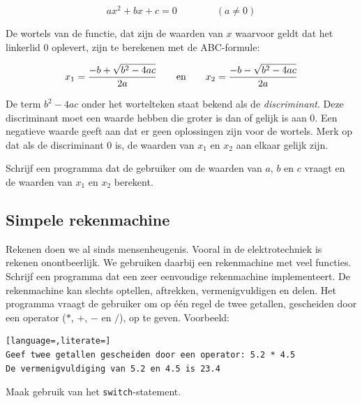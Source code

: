 \documentclass[a4paper,10pt,fleqn,twoside]{article}
\newcommand\strutrule{\rule{0mm}{1.9ex}} %
\begin{document}
\begin{equation*}
ax^2 + bx +c = 0 \qquad\qquad (a \neq 0)
\end{equation*}

De wortels van de functie, dat zijn de waarden van $x$ waarvoor geldt dat het linkerlid 0 oplevert, zijn te berekenen met de ABC-formule:

\begin{equation*}
x_1 = \dfrac{-b+\sqrt{\strutrule b^2-4ac}}{2a} \qquad \text{en} \qquad x_2 = \dfrac{-b-\sqrt{\strutrule b^2-4ac}}{2a}
\end{equation*}

De term $b^2-4ac$ onder het wortelteken staat bekend als de \textsl{discriminant}. Deze discriminant moet een waarde hebben die groter is dan of gelijk is aan 0. Een negatieve waarde geeft aan dat er geen oplossingen zijn voor de wortels. Merk op dat als de discriminant 0 is, de waarden van $x_1$ en $x_2$ aan elkaar gelijk zijn.

Schrijf een programma dat de gebruiker om de waarden van $a$, $b$ en $c$ vraagt en de waarden van $x_1$ en $x_2$ berekent.

\subsection{Simpele rekenmachine}
Rekenen doen we al sinds mensenheugenis. Vooral in de elektrotechniek is rekenen onontbeerlijk. We gebruiken daarbij een rekenmachine met veel functies. Schrijf een programma dat een zeer eenvoudige rekenmachine implementeert. De rekenmachine kan slechts optellen, aftrekken, vermenigvuldigen en delen. Het programma vraagt de gebruiker om op één regel de twee getallen, gescheiden door een operator ($*$, $+$, $-$ en $/$), op te geven. Voorbeeld:

\begin{lstlisting}[language=,literate=]
Geef twee getallen gescheiden door een operator: 5.2 * 4.5
De vermenigvuldiging van 5.2 en 4.5 is 23.4
\end{lstlisting}

Maak gebruik van het \lstinline|switch|-statement.
\end{document}
